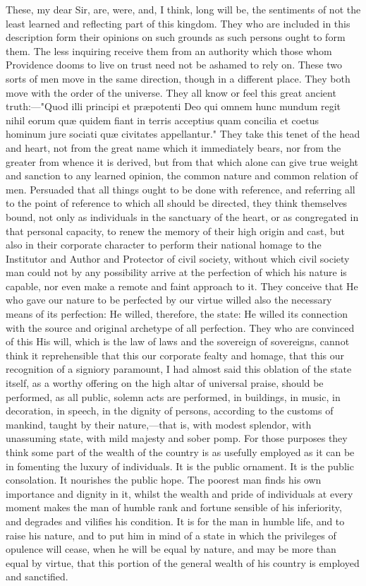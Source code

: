These, my dear Sir, are, were, and, I think, long will be, the sentiments of not the least learned and reflecting part of this kingdom. They who are included in this description form their opinions on such grounds as such persons ought to form them. The less inquiring receive them from an authority which those whom Providence dooms to live on trust need not be ashamed to rely on. These two sorts of men move in the same direction, though in a different place. They both move with the order of the universe. They all know or feel this great ancient truth:—"Quod illi principi et præpotenti Deo qui omnem hunc mundum regit nihil eorum quæ quidem fiant in terris acceptius quam concilia et coetus hominum jure sociati quæ civitates appellantur." They take this tenet of the head and heart, not from the great name which it immediately bears, nor from the greater from whence it is derived, but from that which alone can give true weight and sanction to any learned opinion, the common nature and common relation of men. Persuaded that all things ought to be done with reference, and referring all to the point of reference to which all should be directed, they think themselves bound, not only as individuals in the sanctuary of the heart, or as congregated in that personal capacity, to renew the memory of their high origin and cast, but also in their corporate character to perform their national homage to the Institutor and Author and Protector of civil society, without which civil society man could not by any possibility arrive at the perfection of which his nature is capable, nor even make a remote and faint approach to it. They conceive that He who gave our nature to be perfected by our virtue willed also the necessary means of its perfection: He willed, therefore, the state: He willed its connection with the source and original archetype of all perfection. They who are convinced of this His will, which is the law of laws and the sovereign of sovereigns, cannot think it reprehensible that this our corporate fealty and homage, that this our recognition of a signiory paramount, I had almost said this oblation of the state itself, as a worthy offering on the high altar of universal praise, should be performed, as all public, solemn acts are performed, in buildings, in music, in decoration, in speech, in the dignity of persons, according to the customs of mankind, taught by their nature,—that is, with modest splendor, with unassuming state, with mild majesty and sober pomp. For those purposes they think some part of the wealth of the country is as usefully employed as it can be in fomenting the luxury of individuals. It is the public ornament. It is the public consolation. It nourishes the public hope. The poorest man finds his own importance and dignity in it, whilst the wealth and pride of individuals at every moment makes the man of humble rank and fortune sensible of his inferiority, and degrades and vilifies his condition. It is for the man in humble life, and to raise his nature, and to put him in mind of a state in which the privileges of opulence will cease, when he will be equal by nature, and may be more than equal by virtue, that this portion of the general wealth of his country is employed and sanctified.

